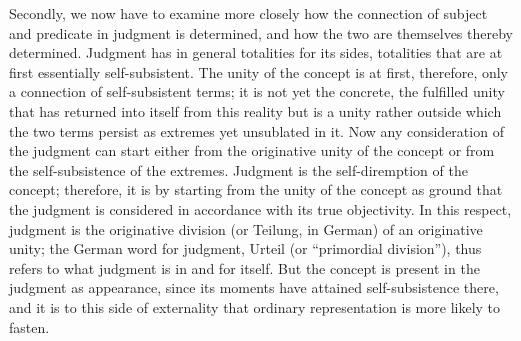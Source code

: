 Secondly, we now have to examine more closely
how the connection of subject and predicate in judgment is determined,
and how the two are themselves thereby determined.
Judgment has in general totalities for its sides,
totalities that are at first essentially self-subsistent.
The unity of the concept is at first, therefore,
only a connection of self-subsistent terms;
it is not yet the concrete,
the fulfilled unity that has returned into itself
from this reality
but is a unity rather outside which the two terms persist as extremes
yet unsublated in it.
Now any consideration of the judgment can start
either from the originative unity of the concept
or from the self-subsistence of the extremes.
Judgment is the self-diremption of the concept;
therefore, it is by starting from the unity
of the concept as ground that the judgment is
considered in accordance with its true objectivity.
In this respect, judgment is the originative division
(or Teilung, in German) of an originative unity;
the German word for judgment, Urteil (or “primordial division”),
thus refers to what judgment is in and for itself.
But the concept is present in the judgment as appearance,
since its moments have attained self-subsistence there,
and it is to this side of externality
that ordinary representation is more likely to fasten.

